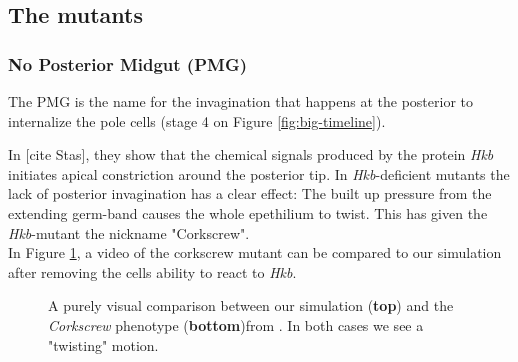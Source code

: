 \subsection{The mutants}
\subsubsection{No Posterior Midgut (PMG)}
The PMG is the name for the invagination that happens at the posterior to internalize the pole cells (stage 4 on Figure \ref{fig:big-timeline}).

In [cite Stas], they show that the chemical signals produced by the protein \textit{Hkb} initiates apical constriction around the posterior tip. In \textit{Hkb}-deficient mutants the lack of posterior invagination has a clear effect: The built up pressure from the extending germ-band causes the whole epethilium to twist. This has given the \textit{Hkb}-mutant the nickname "Corkscrew".\\

In Figure \ref{fig:corkscrew-comparison}, a video of the corkscrew mutant can be compared to our simulation after removing the cells ability to react to \textit{Hkb}.

 
\begin{figure}[H]
    \centering
    \caption{A purely visual comparison between our simulation (\textbf{top}) and the \textit{Corkscrew} phenotype (\textbf{bottom})from . In both cases we see a "twisting" motion.}
    \label{fig:corkscrew-comparison}
\end{figure}

